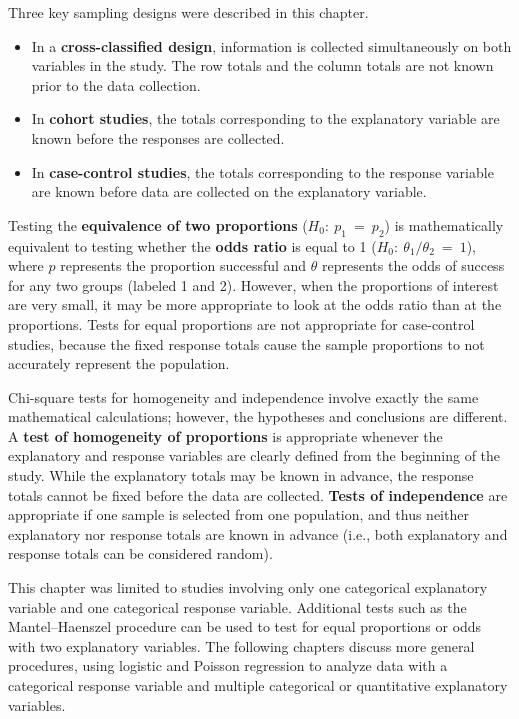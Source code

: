 \documentclass[
]{report}
\providecommand{\tightlist}{%
  \setlength{\itemsep}{0pt}\setlength{\parskip}{0pt}}
\begin{document}
Three key sampling designs were described in this chapter.

\begin{itemize}
\tightlist
\item
  In a \textbf{cross-classified design}, information is collected simultaneously on both variables in the study. The row totals and the column totals are not known prior to the data collection.
\item
  In \textbf{cohort studies}, the totals corresponding to the explanatory variable are known before the responses are collected.
\item
  In \textbf{case-control studies}, the totals corresponding to the response variable are known before data are collected on the explanatory variable.
\end{itemize}

Testing the \textbf{equivalence of two proportions} (\(\scriptstyle H_0:\  p_1 \ =\  p_2\)) is mathematically equivalent to testing whether the \textbf{odds ratio} is equal to 1 (\(\scriptstyle H_0:\  \theta_1/\theta_2 \ = \ 1\)), where \(\scriptstyle p\) represents the proportion successful and \(\scriptstyle \theta\) represents the odds of success for any two groups (labeled 1 and 2). However, when the proportions of interest are very small, it may be more appropriate to look at the odds ratio than at the proportions. Tests for equal proportions are not appropriate for case-control studies, because the fixed response totals cause the sample proportions to not accurately represent the population.

Chi-square tests for homogeneity and independence involve exactly the same mathematical calculations; however, the hypotheses and conclusions are different. A \textbf{test of homogeneity of proportions} is appropriate whenever the explanatory and response variables are clearly defined from the beginning of the study. While the explanatory totals may be known in advance, the response totals cannot be fixed before the data are collected. \textbf{Tests of independence} are appropriate if one sample is selected from one population, and thus neither explanatory nor response totals are known in advance (i.e., both explanatory and response totals can be considered random).

This chapter was limited to studies involving only one categorical explanatory variable and one categorical response variable. Additional tests such as the Mantel--Haenszel procedure can be used to test for equal proportions or odds with two explanatory variables. The following chapters discuss more general procedures, using logistic and Poisson regression to analyze data with a categorical response variable and multiple categorical or quantitative explanatory variables.
\end{document}
